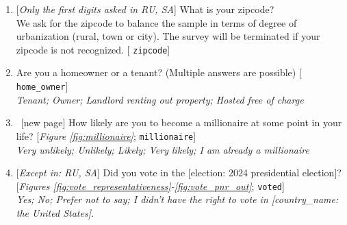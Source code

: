 \begin{enumerate}[resume]
\item  \label{q:zipcode} [\textit{Only the first digits asked in RU, SA}] What is your zipcode?\\
We ask for the zipcode to balance the sample in terms of degree of urbanization (rural, town or city). The survey will be terminated if your zipcode is not recognized. [%
\verb|zipcode|]


\item  \label{q:home} Are you a homeowner or a tenant? (Multiple answers are possible) [%
\verb|home_owner|]
  \\ \textit{Tenant; Owner; Landlord renting out property; Hosted free of charge}

\item ~[new page] \label{q:millionaire} How likely are you to become a millionaire at some point in your life? [\textit{Figure \ref{fig:millionaire}}; 
\verb|millionaire|]
  \\ \textit{Very unlikely; Unlikely; Likely; Very likely; I am already a millionaire}

\item  \label{q:voted} [\textit{Except in: RU, SA}] Did you vote in the [election: 2024 presidential election]? [\textit{Figures \ref{fig:vote_representativeness}-\ref{fig:vote_pnr_out}}; 
\verb|voted|]
  \\ \textit{Yes; No; Prefer not to say; I didn't have the right to vote in [country\_name: the United States].}

\end{enumerate} 

